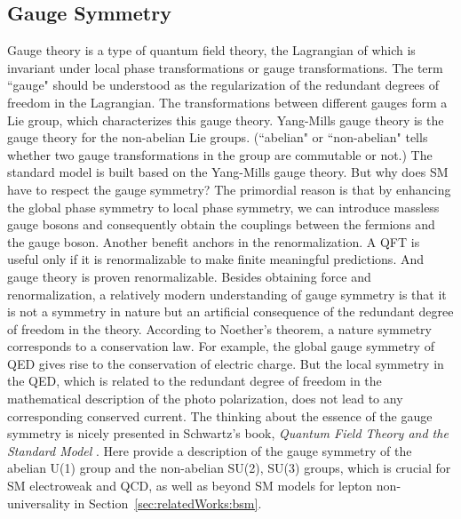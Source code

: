 








\subsection{Gauge Symmetry}
\label{sec:relatedWorks:qft:gaugeSymmetry}

Gauge theory is a type of quantum field theory, the Lagrangian of which is invariant under local phase transformations or gauge transformations. The term ``gauge" should be understood as the regularization of the redundant degrees of freedom in the Lagrangian. The transformations between different gauges form a Lie group, which characterizes this gauge theory. Yang-Mills gauge theory is the gauge theory for the non-abelian Lie groups. (``abelian" or ``non-abelian" tells whether two gauge transformations in the group are commutable or not.) The standard model is built based on the Yang-Mills gauge theory. But why does SM have to respect the gauge symmetry? The primordial reason is that by enhancing the global phase symmetry to local phase symmetry, we can introduce massless gauge bosons and consequently obtain the couplings between the fermions and the gauge boson. Another benefit anchors in the renormalization. A QFT is useful only if it is renormalizable to make finite meaningful predictions. And gauge theory is proven renormalizable. Besides obtaining force and renormalization, a relatively modern understanding of gauge symmetry is that it is not a symmetry in nature but an artificial consequence of the redundant degree of freedom in the theory. According to Noether's theorem, a nature symmetry corresponds to a conservation law. For example, the global gauge symmetry of QED gives rise to the conservation of electric charge. But the local symmetry in the QED, which is related to the redundant degree of freedom in the mathematical description of the photo polarization, does not lead to any corresponding conserved current. The thinking about the essence of the gauge symmetry is nicely presented in Schwartz's book, \textit{Quantum Field Theory and the Standard Model} \cite{schwartz2014quantum}. Here provide a description of the gauge symmetry of the abelian U(1) group and the non-abelian SU(2), SU(3) groups, which is crucial for SM electroweak and QCD, as well as beyond SM models for lepton non-universality in Section~\ref{sec:relatedWorks:bsm}.


